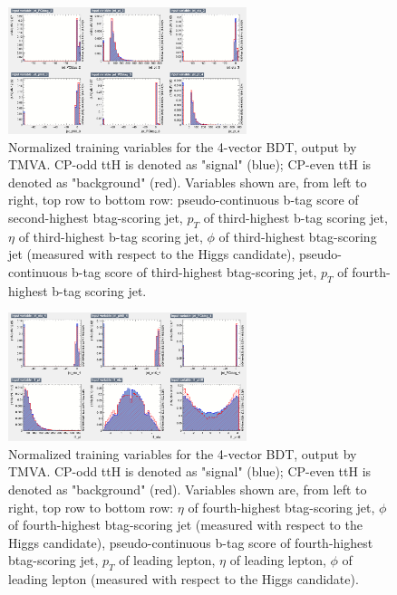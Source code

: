 \begin{figure}[htbp]
  \centering
  \includegraphics[width=0.62\textwidth]{figures/TMVABDTStudies/lep-vbls4vec/lep4vecvbls4.png}
  \caption{Normalized training variables for the 4-vector BDT, output by TMVA. CP-odd ttH is denoted as "signal" (blue); CP-even ttH is denoted as "background" (red). Variables shown are, from left to right, top row to bottom row: pseudo-continuous b-tag score of second-highest btag-scoring jet, $p_{T}$ of third-highest b-tag scoring jet, $\eta$ of third-highest b-tag scoring jet, $\phi$ of third-highest btag-scoring jet (measured with respect to the Higgs candidate), pseudo-continuous b-tag score of third-highest btag-scoring jet, $p_{T}$ of fourth-highest b-tag scoring jet.}
  \label{fig:lep4vecvbls4}
\end{figure}

\begin{figure}[htbp]
  \centering
  \includegraphics[width=0.62\textwidth]{figures/TMVABDTStudies/lep-vbls4vec/lep4vecvbls5.png}
  \caption{Normalized training variables for the 4-vector BDT, output by TMVA. CP-odd ttH is denoted as "signal" (blue); CP-even ttH is denoted as "background" (red). Variables shown are, from left to right, top row to bottom row: $\eta$ of fourth-highest btag-scoring jet, $\phi$ of fourth-highest btag-scoring jet (measured with respect to the Higgs candidate), pseudo-continuous b-tag score of fourth-highest btag-scoring jet, $p_{T}$ of leading lepton, $\eta$ of leading lepton, $\phi$ of leading lepton (measured with respect to the Higgs candidate).}
  \label{fig:lep4vecvbls5}
\end{figure}

